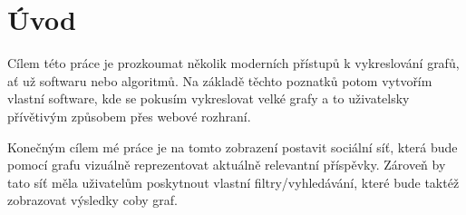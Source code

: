 \chapter*{Úvod}

Cílem této práce je prozkoumat několik moderních přístupů k vykreslování grafů, ať už softwaru nebo algoritmů.
Na základě těchto poznatků potom vytvořím vlastní software,
kde se pokusím vykreslovat velké grafy a to uživatelsky přívětivým způsobem přes webové rozhraní.

Konečným cílem mé práce je na tomto zobrazení postavit sociální síť, která bude pomocí grafu vizuálně reprezentovat aktuálně relevantní příspěvky.
Zároveň by tato síť měla uživatelům poskytnout vlastní filtry/vyhledávání, které bude taktéž zobrazovat výsledky coby graf.